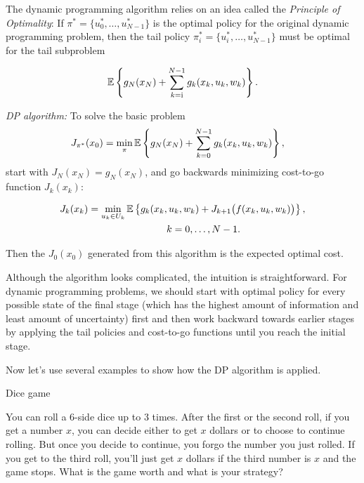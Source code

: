 The dynamic programming algorithm relies on an idea called the \emph{Principle of
Optimality}: If $\pi^*=\{u_0^*,\ldots,u_{N-1}^*\}$ is the optimal policy for the
original dynamic programming problem, then the tail policy
$\pi_i^*=\{u_i^*,\ldots,u_{N-1}^*\}$ must be optimal for the tail subproblem

\[
\begin{aligned}
\mathbb{E}\left\{g_N(x_N)+\sum_{k=\mathrm{i}}^{N-1}g_k(x_k,u_k,w_k)\right\}.
\end{aligned}
\]

\emph{DP algorithm:} To solve the basic problem
\[
\begin{aligned}
J_{\pi^*}(x_0)
&=\min_{\pi}\mathbb{E}\left\{g_N(x_N)+\sum_{k=0}^{N-1}g_k(x_k,u_k,w_k)\right\},
\end{aligned}
\]
start with $J_N(x_N)=g_N(x_N)$, and go backwards minimizing cost-to-go function
$J_k(x_k)$:

\[
\begin{aligned}
J_k(x_k)
&=\min_{u_k\in U_k}\mathbb{E}\left\{g_k(x_k,u_k,w_k)
 +J_{k+1}\bigl(f(x_k,u_k,w_k)\bigr)\right\},\\
&\hspace{8em} k=0,\ldots,N-1.
\end{aligned}
\]

Then the $J_0(x_0)$ generated from this algorithm is the expected optimal cost.

Although the algorithm looks complicated, the intuition is straightforward. For
dynamic programming problems, we should start with optimal policy for every
possible state of the final stage (which has the highest amount of information and
least amount of uncertainty) first and then work backward towards earlier stages
by applying the tail policies and cost-to-go functions until you reach the initial
stage.

Now let's use several examples to show how the DP algorithm is applied.


\begin{problem}{Dice game}

You can roll a 6-side dice up to 3 times. After the first or the second roll, if you
get a number $x$, you can decide either to get $x$ dollars or to choose to continue
rolling. But once you decide to continue, you forgo the number you just rolled. If
you get to the third roll, you'll just get $x$ dollars if the third number is $x$
and the game stops. What is the game worth and what is your strategy?
\end{problem}

